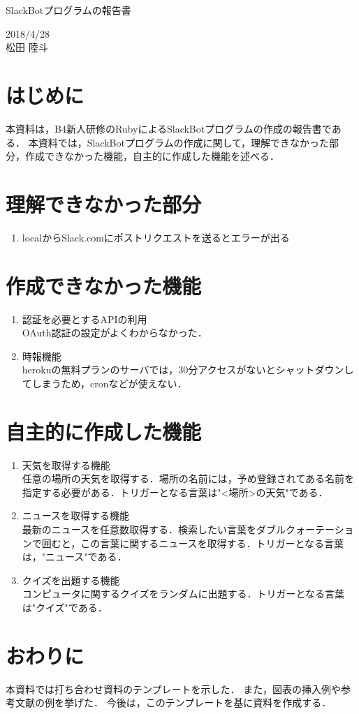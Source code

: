 \documentclass[12pt]{jsarticle}
\begin{document}
\begin{center}
{\LARGE SlackBotプログラムの報告書}
\end{center}

\begin{flushright}
  2018/4/28\\
  松田 陸斗
\end{flushright}
\section{はじめに}
\label{sec:introduction}
本資料は，B4新人研修のRubyによるSlackBotプログラムの作成の報告書である．
本資料では，SlackBotプログラムの作成に関して，理解できなかった部分，作成できなかった機能，自主的に作成した機能を述べる．

\section{理解できなかった部分}
\begin{enumerate}
\item 	localからSlack.comにポストリクエストを送るとエラーが出る\\
\end{enumerate}

\section{作成できなかった機能}
\begin{enumerate}
\item 認証を必要とするAPIの利用\\
OAuth認証の設定がよくわからなかった．
\item 時報機能\\
herokuの無料プランのサーバでは，30分アクセスがないとシャットダウンしてしまうため，cronなどが使えない．
\end{enumerate}

\section{自主的に作成した機能}
\begin{enumerate}
\item 天気を取得する機能\\
任意の場所の天気を取得する．場所の名前には，予め登録されてある名前を指定する必要がある．トリガーとなる言葉は"<場所>の天気"である．
\item ニュースを取得する機能\\
最新のニュースを任意数取得する．検索したい言葉をダブルクォーテーションで囲むと，この言葉に関するニュースを取得する．トリガーとなる言葉は，"ニュース"である．
\item クイズを出題する機能\\
コンピュータに関するクイズをランダムに出題する．トリガーとなる言葉は"クイズ"である．
\end{enumerate}

\section{おわりに}
\label{sec:conclusion}
本資料では打ち合わせ資料のテンプレートを示した．
また，図表の挿入例や参考文献の例を挙げた．
今後は，このテンプレートを基に資料を作成する．



\end{document}
